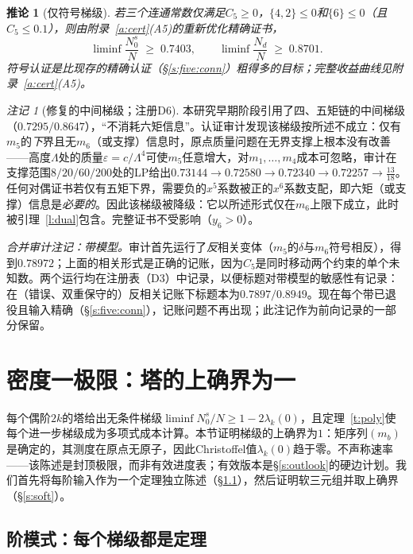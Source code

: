 \documentclass[11pt]{article}
\numberwithin{equation}{section}
\newtheorem{corollary}[theorem]{推论}
\theoremstyle{definition}
\theoremstyle{remark}
\newtheorem{remark}[theorem]{注记}
\begin{document}
\begin{corollary}[仅符号梯级]\label{c:signs}
若三个连通常数仅满足$C_5\ge0$，$\{4,2\}\le0$和$\{6\}\le0$（且$C_5\le0.1$），则由附录~\ref{a:cert}(A5)的重新优化精确证书，
\[
\liminf\frac{N_0^{s}}{N}\;\ge\;0.7403,\qquad
\liminf\frac{N_d}{N}\;\ge\;0.8701 .
\]
符号认证是比现存的精确认证（\S\ref{s:five:conn}）粗得多的目标；完整收益曲线见附录~\ref{a:cert}(A5)。
\end{corollary}

\begin{remark}[修复的中间梯级；注册D6]\label{r:rung}
本研究早期阶段引用了四、五矩链的中间梯级（$0.7295/0.8647$），“不消耗六矩信息”。认证审计发现该梯级按所述不成立：仅有$m_5$的\emph{下}界且无$m_6$（或支撑）信息时，原点质量问题在无界支撑上根本没有改善——高度$\Lambda$处的质量$\varepsilon=c/\Lambda^{4}$可使$m_5$任意增大，对$m_1,\dots,m_4$成本可忽略，审计在支撑范围$8/20/60/200$处的LP给出$0.73144\to0.72580\to0.72340\to0.72257\to\tfrac{13}{18}$。任何对偶证书若仅有五矩下界，需要负的$x^5$系数被正的$x^6$系数支配，即六矩（或支撑）信息是\emph{必要的}。因此该梯级被降级：它以所述形式仅在$m_6$上限下成立，此时被引理~\ref{l:dual}包含。完整证书不受影响（$y_6>0$）。
\end{remark}

\medskip
\noindent\emph{合并审计注记：带模型。}审计首先运行了\emph{反}相关变体（$m_5$的$\delta$与$m_6$符号相反），得到$0.78972$；上面的相关形式是正确的记账，因为$C_5$是同时移动两个约束的单个未知数。两个运行均在注册表（D3）中记录，以便标题对带模型的敏感性有记录：在（错误、双重保守的）反相关记账下标题本为$0.7897/0.8949$。现在每个带已退役且输入精确（\S\ref{s:five:conn}），记账问题不再出现；此注记作为前向记录的一部分保留。

\section{密度一极限：塔的上确界为一}\label{s:dens}

每个偶阶$2k$的塔给出无条件梯级$\liminf N_0^{s}/N\ge1-2\lambda_k(0)$，且定理~\ref{t:poly}使每个进一步梯级成为多项式成本计算。本节证明梯级的上确界为$1$：矩序列$(m_b)$是确定的，其测度在原点无原子，因此Christoffel值$\lambda_k(0)$趋于零。不声称速率——该陈述是封顶极限，而非有效进度表；有效版本是\S\ref{s:outlook}的硬边计划。我们首先将每阶输入作为一个定理独立陈述（\S\ref{s:schema}），然后证明软三元组并取上确界（\S\ref{s:soft}）。

\subsection{阶模式：每个梯级都是定理}\label{s:schema}
\end{document}
